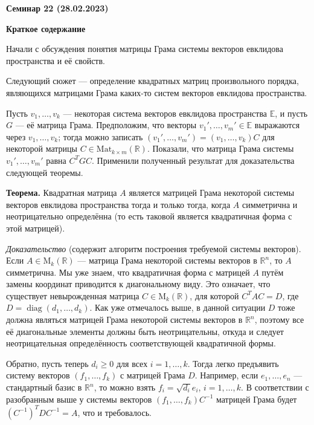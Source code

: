 \documentclass[10pt, a4paper]{extarticle}
\def \R{\mathbb{R}}
\newcommand{\diag}{\operatorname{diag}}
\theoremstyle{definition}
\begin{document}
\begin{center}
\small
\noindent{}
\end{center}

\large

\begin{center}
\textbf{Семинар 22 (28.02.2023)}
\end{center}

\textbf{Краткое содержание}

Начали с обсуждения понятия матрицы Грама системы векторов евклидова пространства и её свойств.

Следующий сюжет --- определение квадратных матриц произвольного порядка, являющихся матрицами Грама каких-то систем векторов евклидова пространства.

Пусть $v_1,\dots,v_k$ --- некоторая система векторов евклидова пространства $\mathbb E$, и пусть $G$ --- её матрица Грама.
Предположим, что векторы $v_1',\dots,v_m' \in \mathbb E$ выражаются через $v_1, \dots, v_k$; тогда можно записать $(v_1',\dots,v_m') = (v_1,\dots, v_k)C$ для некоторой матрицы $C \in \mathrm{Mat}_{k\times m}(\R)$.
Показали, что матрица Грама системы $v_1',\dots, v_m'$ равна $C^TGC$.
Применили полученный результат для доказательства следующей теоремы.

\textbf{Теорема.} Квадратная матрица $A$ является матрицей Грама некоторой системы векторов евклидова пространства тогда и только тогда, когда $A$ симметрична и неотрицательно определённа (то есть таковой является квадратичная форма с этой матрицей).

\textit{Доказательство} (содержит алгоритм построения требуемой системы векторов).
Если $A \in \mathrm{M}_k(\R)$ --- матрица Грама некоторой системы векторов в $\R^n$, то $A$ симметрична.
Мы уже знаем, что квадратичная форма с матрицей $A$ путём замены координат приводится к диагональному виду.
Это означает, что существует невырожденная матрица $C \in \mathrm{M}_k(\R)$, для которой $C^TAC = D$, где $D = \diag(d_1,\dots,d_k)$.
Как уже отмечалось выше, в данной ситуации $D$ тоже должна являться матрицей Грама некоторой системы векторов в $\R^n$, поэтому все её диагональные элементы должны быть неотрицательны, откуда и следует неотрицательная определённость соответствующей квадратичной формы.

Обратно, пусть теперь $d_i \geqslant 0$ для всех $i = 1,\dots,k$.
Тогда легко предъявить систему векторов $(f_1,\dots, f_k)$ с матрицей Грама $D$.
Например, если $e_1,\dots, e_n$ --- стандартный базис в $\R^n$, то можно взять $f_i = \sqrt{d_i}e_i$, $i=1,\dots,k$.
В соответствии с разобранным выше у системы векторов $(f_1,\dots,f_k)C^{-1}$ матрицей Грама будет $(C^{-1})^TDC^{-1} = A$, что и требовалось.
\end{document}
